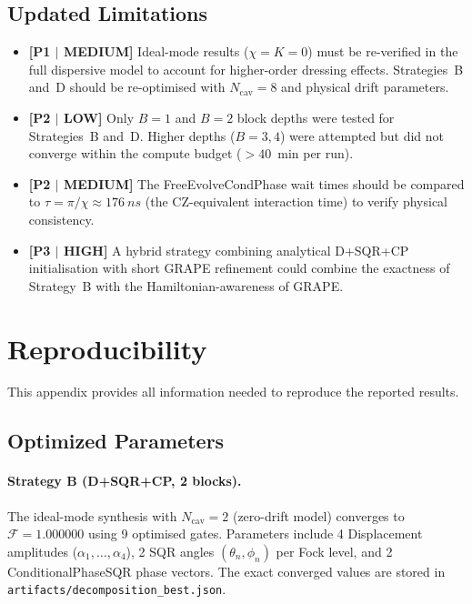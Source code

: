 \documentclass[aps,pra,twocolumn,reprint,floatfix,amsmath,amssymb]{revtex4-2}
\begin{document}
\subsection{Updated Limitations}

\begin{itemize}
  \item \textbf{[P1 $|$ MEDIUM]} Ideal-mode results ($\chi=K=0$)
    must be re-verified in the full dispersive model to account for
    higher-order dressing effects.  Strategies~B and~D should be
    re-optimised with $N_\mathrm{cav}=8$ and physical drift
    parameters.

  \item \textbf{[P2 $|$ LOW]} Only $B=1$ and $B=2$ block depths were
    tested for Strategies~B and~D.  Higher depths ($B=3,4$) were
    attempted but did not converge within the compute budget
    ($>40$~min per run).

  \item \textbf{[P2 $|$ MEDIUM]} The FreeEvolveCondPhase wait times
    should be compared to $\tau=\pi/\chi\approx\SI{176}{ns}$
    (the CZ-equivalent interaction time) to verify physical
    consistency.

  \item \textbf{[P3 $|$ HIGH]} A hybrid strategy combining
    analytical D+SQR+CP initialisation with short GRAPE refinement
    could combine the exactness of Strategy~B with the
    Hamiltonian-awareness of GRAPE.
\end{itemize}

\section{Reproducibility}\label{app:repro}

This appendix provides all information needed to reproduce the
reported results.

\subsection{Optimized Parameters}

\paragraph{Strategy B (D+SQR+CP, 2 blocks).}
The ideal-mode synthesis with $N_\mathrm{cav}=2$ (zero-drift model)
converges to $\mathcal{F}=1.000000$ using 9 optimised gates.
Parameters include 4 Displacement amplitudes
($\alpha_1,\ldots,\alpha_4$), 2 SQR angles
$(\theta_n,\phi_n)$ per Fock level, and 2 ConditionalPhaseSQR
phase vectors.  The exact converged values are stored in
\texttt{artifacts/decomposition\_best.json}.
\end{document}
